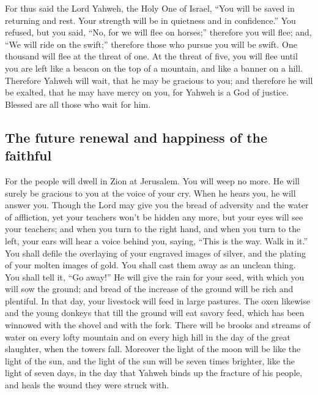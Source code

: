  For thus said the Lord Yahweh, the Holy One of Israel,
``You will be saved in returning and rest. Your strength will be in
quietness and in confidence.'' You refused,  but you
said, ``No, for we will flee on horses;'' therefore you will flee; and,
``We will ride on the swift;'' therefore those who pursue you will be
swift.  One thousand will flee at the threat of one. At
the threat of five, you will flee until you are left like a beacon on
the top of a mountain, and like a banner on a hill. 
Therefore Yahweh will wait, that he may be gracious to you; and
therefore he will be exalted, that he may have mercy on you, for Yahweh
is a God of justice. Blessed are all those who wait for him.

\hypertarget{the-future-renewal-and-happiness-of-the-faithful}{%
\subsection{The future renewal and happiness of the
faithful}\label{the-future-renewal-and-happiness-of-the-faithful}}

 For the people will dwell in Zion at Jerusalem. You will
weep no more. He will surely be gracious to you at the voice of your
cry. When he hears you, he will answer you.  Though the
Lord may give you the bread of adversity and the water of affliction,
yet your teachers won't be hidden any more, but your eyes will see your
teachers;  and when you turn to the right hand, and when
you turn to the left, your ears will hear a voice behind you, saying,
``This is the way. Walk in it.''  You shall defile the
overlaying of your engraved images of silver, and the plating of your
molten images of gold. You shall cast them away as an unclean thing. You
shall tell it, ``Go away!''  He will give the rain for
your seed, with which you will sow the ground; and bread of the increase
of the ground will be rich and plentiful. In that day, your livestock
will feed in large pastures.  The oxen likewise and the
young donkeys that till the ground will eat savory feed, which has been
winnowed with the shovel and with the fork.  There will
be brooks and streams of water on every lofty mountain and on every high
hill in the day of the great slaughter, when the towers fall.
 Moreover the light of the moon will be like the light of
the sun, and the light of the sun will be seven times brighter, like the
light of seven days, in the day that Yahweh binds up the fracture of his
people, and heals the wound they were struck with.

